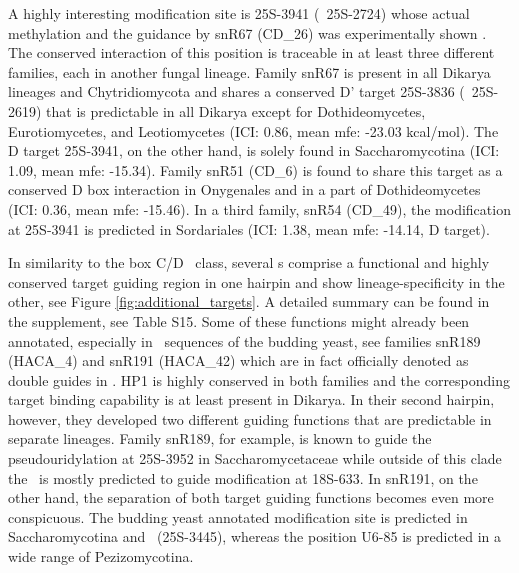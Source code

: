 A highly interesting modification site is 25S-3941 (\sce\ 25S-2724)
whose actual methylation and the guidance by snR67 (CD\_26) was experimentally shown
\cite{Lowe:1999}. The conserved interaction of this position is
traceable in at least three different families, each in another fungal
lineage. Family snR67 is present in all Dikarya lineages and Chytridiomycota and shares a conserved D' target 25S-3836 (\sce\ 25S-2619)
that is predictable in all Dikarya except for Dothideomycetes,
Eurotiomycetes, and Leotiomycetes (ICI: 0.86, mean mfe: -23.03
kcal/mol). The D target 25S-3941, on the other hand,
is solely found in Saccharomycotina (ICI: 1.09, mean mfe: -15.34). Family snR51 (CD\_6) is found to share this target as a conserved D box
interaction in Onygenales and in a part of Dothideomycetes (ICI: 0.36, mean mfe:
-15.46). In a third family, snR54 (CD\_49), the
modification at 25S-3941 is predicted in Sordariales (ICI: 1.38, mean
mfe: -14.14, D target).

In similarity to the box C/D \sno\ class, several \haca s comprise a
functional and highly conserved target guiding region in one hairpin
and show lineage-specificity in the other, see Figure \ref{fig:additional_targets}. 
A detailed summary can be found in the
supplement, see Table S15. Some of these functions might already been annotated, 
especially in \sno\ sequences of the budding yeast, see families
snR189 (HACA\_4) and snR191 (HACA\_42) which are in fact officially denoted as double guides
in \sce.  HP1 is highly conserved in both families and the corresponding
target binding capability is at least present in Dikarya. In their second hairpin,
however, they developed two different guiding functions that are
predictable in separate lineages. Family snR189, for example, is known to
guide the pseudouridylation at 25S-3952 in Saccharomycetaceae while
outside of this clade the \sno\ is mostly predicted to guide modification
at 18S-633. In snR191, on the other hand, the separation of both
target guiding functions becomes even more conspicuous. The budding yeast
annotated modification site is predicted in Saccharomycotina and \Tde\
(25S-3445), whereas the position U6-85 is predicted in a wide range of
Pezizomycotina.

